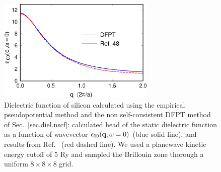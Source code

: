 \documentclass[twocolumn,prb,showpacs,superscriptaddress]{revtex4}
\def\w{\omega}
\def\q{{\bf q}}
\begin{document}
\begin  {figure}
\begin  {center}
\includegraphics[width=7.5cm]{fig1.eps}
\end    {center}
\caption{\label{fig1}
        Dielectric function of silicon calculated using the empirical pseudopotential method and the
        non self-consistent DFPT method of Sec.\ \ref{sec.diel.nscf}:
        calculated head of the static dielectric function as a function of wavevector $\epsilon_{00}(\q,\w=0)$ (blue solid line),
        and results from Ref.\  (red dashed line). We used a planewave kinetic energy cutoff of 5 Ry
        and sampled the Brillouin zone thorough a uniform $8\times 8\times 8$ grid.
        }
\end    {figure}
\end{document}
